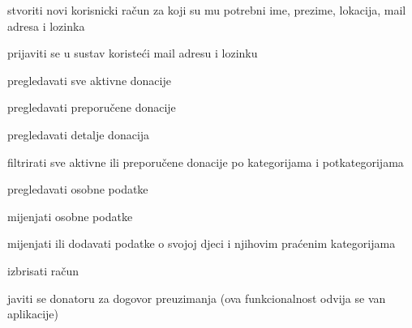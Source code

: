 			
			\begin{packed_enum}
				\item  {}
				
				\begin{packed_enum}
					
					\item stvoriti novi korisnicki račun za koji su mu potrebni ime, prezime, lokacija, mail adresa i lozinka
					
				\end{packed_enum}

				\item  {}
				
				\begin{packed_enum}
					
					\item prijaviti se u sustav koristeći mail adresu i lozinku
					
				\end{packed_enum}
			
				\item  {}
				
				\begin{packed_enum}
					
					\item pregledavati sve aktivne donacije
					\item pregledavati preporučene donacije
					\item pregledavati detalje donacija
					\item filtrirati sve aktivne ili preporučene donacije po kategorijama i potkategorijama
					\item pregledavati osobne podatke
					\item mijenjati osobne podatke
					\item mijenjati ili dodavati podatke o svojoj djeci i njihovim praćenim kategorijama
					\item izbrisati račun
					\item javiti se donatoru za dogovor preuzimanja (ova funkcionalnost odvija se van aplikacije)		
					
				\end{packed_enum}

				\item  {}
				
				\begin{packed_enum}
					

\end{packed_enum}
\end{packed_enum}

